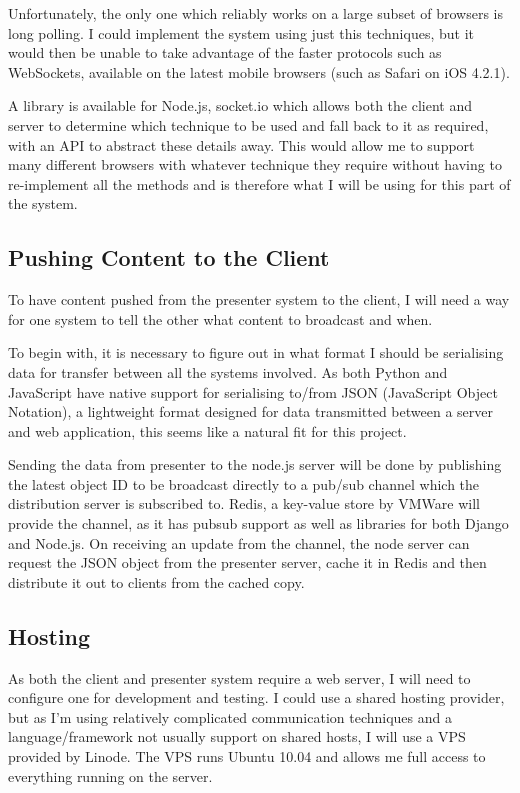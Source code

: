 \documentclass[a4papert,11pt,notitlepage]{ltxdoc}
\begin{document}
Unfortunately, the only one which reliably works on a large subset of browsers is long polling. I could implement the system using just this techniques, but it would then be unable to take advantage of the faster protocols such as WebSockets, available on the latest mobile browsers (such as Safari on iOS 4.2.1).

A library is available for Node.js, socket.io which allows both the client and server to determine which technique to be used and fall back to it as required, with an API to abstract these details away. This would allow me to support many different browsers with whatever technique they require without having to re-implement all the methods and is therefore what I will be using for this part of the system.

\subsection{Pushing Content to the Client}
To have content pushed from the presenter system to the client, I will need a way for one system to tell the other what content to broadcast and when. 

To begin with, it is necessary to figure out in what format I should be serialising data for transfer between all the systems involved. As both Python and JavaScript have native support for serialising to/from JSON (JavaScript Object Notation), a lightweight format designed for data transmitted between a server and web application, this seems like a natural fit for this project.

Sending the data from presenter to the node.js server will be done by publishing the latest object ID to be broadcast directly to a pub/sub channel which the distribution server is subscribed to. Redis, a key-value store by VMWare will provide the channel, as it has pubsub support as well as libraries for both Django and Node.js. On receiving an update from the channel, the node server can request the JSON object from the presenter server, cache it in Redis and then distribute it out to clients from the cached copy.

\subsection{Hosting}
As both the client and presenter system require a web server, I will need to configure one for development and testing. I could use a shared hosting provider, but as I'm using relatively complicated communication techniques and a language/framework not usually support on shared hosts, I will use a VPS provided by Linode. The VPS runs Ubuntu 10.04 and allows me full access to everything running on the server.
\end{document}
